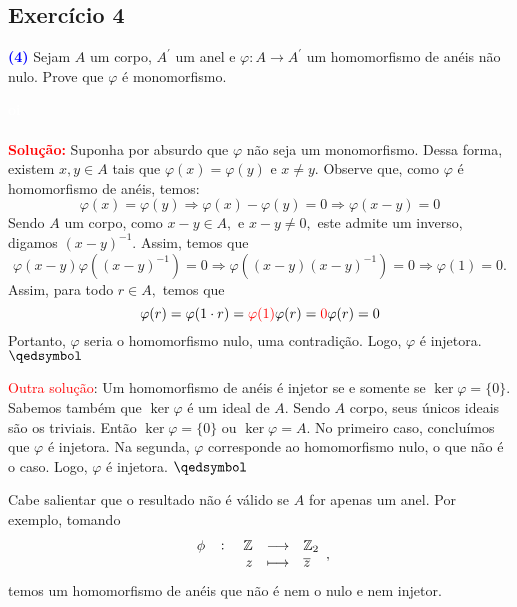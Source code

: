 \documentclass[11pt,a4paper]{article}
\newcommand{\exercicio}[1]{\subsection{Exercício #1} \textcolor{blue}{\bf(#1)}}
\newcommand{\solucao}[1]{
\textbf{\textcolor{white}{oi}\\ \\ \textcolor{red}{Solução:}} #1}
\begin{document}
\exercicio{4} Sejam $A$ um corpo, $A^{\prime}$ um anel e $\varphi \colon A \to A^{\prime}$ um homomorfismo de anéis não nulo. Prove que $\varphi$ é monomorfismo.
\solucao{
Suponha por absurdo que $\varphi$ não seja um monomorfismo. Dessa forma, existem $x, y \in A$ tais que $\varphi(x) = \varphi(y)$ e $x \neq y.$ Observe que, como $\varphi$ é homomorfismo de anéis, temos:
\[
\varphi(x) = \varphi(y) \Rightarrow \varphi(x) - \varphi(y) = 0 \Rightarrow \varphi(x - y) = 0
\]
Sendo $A$ um corpo, como $x - y \in A,$ e $x - y \neq 0,$ este admite um inverso, digamos $(x-y)^{-1}.$ Assim, temos que
\[
\varphi(x-y)\varphi((x-y)^{-1}) = 0 \Rightarrow \varphi((x-y)(x-y)^{-1}) = 0 \Rightarrow \varphi(1) = 0.
\]
Assim, para todo $r \in A,$ temos que
\[
\varphi(r) = \varphi(1 \cdot r) = \textcolor{red}{\varphi(1)} \varphi(r) = \textcolor{red}{0} \varphi(r) = 0
\]
Portanto, $\varphi$ seria o homomorfismo nulo, uma contradição. Logo,  $\varphi$ é injetora. $\qedsymbol$

\bigskip
\noindent
\textcolor{red}{Outra solução}: Um homomorfismo de anéis é injetor se e somente se $\ker \varphi = \{ 0 \}.$ Sabemos também que $\ker \varphi$ é um ideal de $A.$ Sendo $A$ corpo, seus únicos ideais são os triviais. Então $\ker \varphi = \{ 0 \}$ ou $\ker \varphi = A.$ No primeiro caso, concluímos que $\varphi$ é injetora. Na segunda, $\varphi$ corresponde ao homomorfismo nulo, o que não é o caso. Logo, $\varphi$ é injetora. $\qedsymbol$

\medskip
\noindent
Cabe salientar que o resultado não é válido se $A$ for apenas um anel. Por exemplo, tomando
\[
\fullfunction{\phi}{\mathbb{Z}}{\mathbb{Z}_2}{z}{\overline{z}},
\]
temos um homomorfismo de anéis que não é nem o nulo e nem injetor.
}
\end{document}
